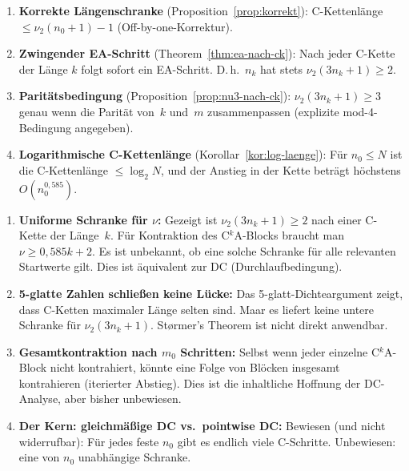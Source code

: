 \documentclass[12pt,a4paper]{article}
\newcommand{\vii}{\nu_2}
\begin{document}
	\begin{tcolorbox}[ergebnis, title={Bewiesene neue Ergebnisse dieses Dokuments}]
		\begin{enumerate}[label=(\arabic*)]
			\item \textbf{Korrekte Längenschranke} (Proposition~\ref{prop:korrekt}):
			C-Kettenlänge $\leq \vii(n_0+1) - 1$ (Off-by-one-Korrektur).
			
			\item \textbf{Zwingender EA-Schritt} (Theorem~\ref{thm:ea-nach-ck}):
			Nach jeder C-Kette der Länge $k$ folgt sofort ein EA-Schritt.
			D.\,h.\ $n_k$ hat stets $\vii(3n_k+1) \geq 2$.
			
			\item \textbf{Paritätsbedingung} (Proposition~\ref{prop:nu3-nach-ck}):
			$\vii(3n_k+1) \geq 3$ genau wenn die Parität von~$k$ und~$m$ zusammenpassen
			(explizite mod-4-Bedingung angegeben).
			
			\item \textbf{Logarithmische C-Kettenlänge} (Korollar~\ref{kor:log-laenge}):
			Für $n_0 \leq N$ ist die C-Kettenlänge $\leq \log_2 N$, und der Anstieg
			in der Kette beträgt höchstens $O(n_0^{0{,}585})$.
		\end{enumerate}
	\end{tcolorbox}
	
	\begin{tcolorbox}[lücke, title={Offene Fragen --- präzise benannt}]
		\begin{enumerate}[label=(\arabic*)]
			\item \textbf{Uniforme Schranke für $\nu$:}
			Gezeigt ist $\vii(3n_k+1) \geq 2$ nach einer C-Kette der Länge~$k$.
			Für Kontraktion des C$^k$A-Blocks braucht man $\nu \geq 0{,}585k + 2$.
			Es ist unbekannt, ob eine solche Schranke für alle relevanten Startwerte
			gilt. Dies ist äquivalent zur DC (Durchlaufbedingung).
			
			\item \textbf{5-glatte Zahlen schließen keine Lücke:}
			Das 5-glatt-Dichteargument zeigt, dass C-Ketten maximaler Länge selten sind.
			Maar es liefert keine untere Schranke für $\vii(3n_k+1)$.
			Størmer's Theorem ist nicht direkt anwendbar.
			
			\item \textbf{Gesamtkontraktion nach $m_0$ Schritten:}
			Selbst wenn jeder einzelne C$^k$A-Block nicht kontrahiert, könnte eine
			Folge von Blöcken insgesamt kontrahieren (iterierter Abstieg).
			Dies ist die inhaltliche Hoffnung der DC-Analyse, aber bisher unbewiesen.
			
			\item \textbf{Der Kern: gleichmäßige DC vs.\ pointwise DC:}
			Bewiesen (und nicht widerrufbar): Für jedes feste $n_0$ gibt es endlich
			viele C-Schritte. Unbewiesen: eine von $n_0$ unabhängige Schranke.
		\end{enumerate}
	\end{tcolorbox}
	
\end{document}
